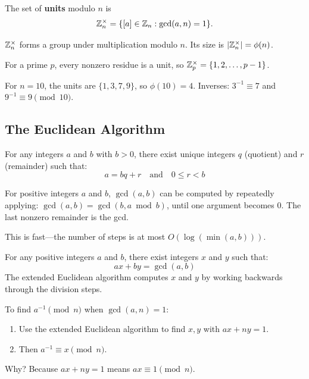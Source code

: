 \begin{definition}
The set of \textbf{units} modulo $n$ is
\[
\mathbb{Z}_n^\times = \{[a] \in \mathbb{Z}_n : \gcd(a,n) = 1\}.
\]
\end{definition}

\begin{theorem}
$\mathbb{Z}_n^\times$ forms a group under multiplication modulo $n$. Its size is $|\mathbb{Z}_n^\times| = \phi(n)$.
\end{theorem}

For a prime $p$, every nonzero residue is a unit, so $\mathbb{Z}_p^\times = \{1,2,\ldots,p-1\}$.

\begin{example}
For $n = 10$, the units are $\{1,3,7,9\}$, so $\phi(10)=4$. Inverses: $3^{-1} \equiv 7$ and $9^{-1} \equiv 9 \pmod{10}$.
\end{example}

\subsection*{The Euclidean Algorithm}

\begin{theorem}
For any integers $a$ and $b$ with $b > 0$, there exist unique integers $q$ (quotient) and $r$ (remainder) such that:
\[
a = bq + r \quad \text{and} \quad 0 \leq r < b
\]
\end{theorem}

\begin{theorem}
For positive integers $a$ and $b$, $\gcd(a, b)$ can be computed by repeatedly applying: $\gcd(a, b) = \gcd(b, a \bmod b)$, until one argument becomes 0. The last nonzero remainder is the gcd.
\end{theorem}

This is fast---the number of steps is at most $O(\log(\min(a,b)))$.

\begin{theorem}
For any positive integers $a$ and $b$, there exist integers $x$ and $y$ such that:
\[
ax + by = \gcd(a, b)
\]
The extended Euclidean algorithm computes $x$ and $y$ by working backwards through the division steps.
\end{theorem}

\begin{strategy}
To find $a^{-1} \pmod{n}$ when $\gcd(a,n) = 1$:
\begin{enumerate}
  \item Use the extended Euclidean algorithm to find $x, y$ with $ax + ny = 1$.
  \item Then $a^{-1} \equiv x \pmod{n}$.
\end{enumerate}
Why? Because $ax + ny = 1$ means $ax \equiv 1 \pmod{n}$.
\end{strategy}

